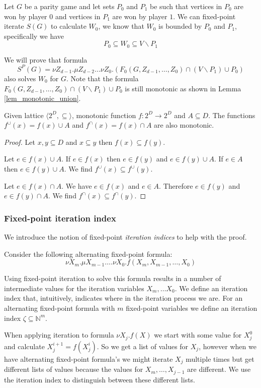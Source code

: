 Let $G$ be a parity game and let sets $P_0$ and $P_1$ be such that vertices in $P_0$ are won by player $0$ and vertices in $P_1$ are won by player $1$. We can fixed-point iterate $S(G)$ to calculate $W_0$, we know that $W_0$ is bounded by $P_0$ and $P_1$, specifically we have
\[ P_0 \subseteq W_0 \subseteq V\backslash P_1\]

We will prove that formula 
\[ S^P(G) = \nu Z_{d-1}.\mu Z_{d-2}\dots \nu Z_0.(F_0(G,Z_{d-1},\dots,Z_0) \cap (V\backslash P_1) \cup P_0) \]
also solves $W_0$ for $G$. Note that the formula $F_0(G,Z_{d-1},\dots,Z_0) \cap (V\backslash P_1) \cup P_0$ is still monotonic as shown in Lemma \ref{lem_monotonic_union}.
\begin{lemma}
	\label{lem_monotonic_union}
	Given lattice $\langle 2^D, \subseteq \rangle $, monotonic function $f :  2^D \rightarrow 2^D$ and $A \subseteq D$. The functions $f^\cup(x) = f(x) \cup A$ and $f^\cap(x) = f(x) \cap A$ are also monotonic.
	\begin{proof}
		Let $x,y \subseteq D$ and $x\subseteq y$ then $f(x) \subseteq f(y)$.
		
		Let $e \in f(x) \cup A$. If $e \in f(x)$ then $e \in f(y)$ and $e \in f(y) \cup A$. If $e \in A$ then $e \in f(y) \cup A$. We find $f^\cup(x) \subseteq f^\cup(y)$.
		
		Let $e \in f(x) \cap A$. We have $e \in f(x)$ and $e \in A$. Therefore $e \in f(y)$ and $e \in f(y) \cap A$. We find $f^\cap(x) \subseteq f^\cap(y)$.
	\end{proof}
\end{lemma}

\subsubsection{Fixed-point iteration index} We introduce the notion of fixed-point \textit{iteration indices} to help with the proof.

Consider the following alternating fixed-point formula:
\[ \nu X_m.\mu X_{m-1}\dots.\nu X_0.f(X_m,X_{m-1},\dots,X_0) \]

Using fixed-point iteration to solve this formula results in a number of intermediate values for the iteration variables $X_m,\dots X_0$. We define an iteration index that, intuitively, indicates where in the iteration process we are. For an alternating fixed-point formula with $m$ fixed-point variables we define an iteration index $\zeta \subseteq \mathbb{N}^m$.

When applying iteration to formula $\nu X_j.f(X)$ we start with some value for $X_j^0$ and calculate $X_j^{i+1} = f(X_j^{i})$. So we get a list of values for $X_j$, however when we have alternating fixed-point formula's we might iterate $X_j$ multiple times but get different lists of values because the values for $X_m,\dots,X_{j-1}$ are different. We use the iteration index to distinguish between these different lists. 

